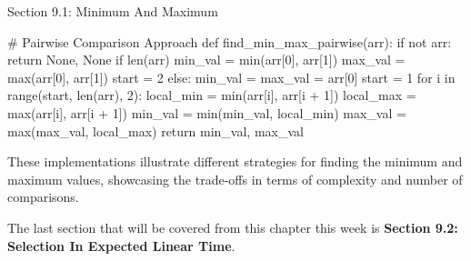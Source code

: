 \begin{notes}{Section 9.1: Minimum And Maximum}
\begin{highlight}
\begin{code}[Python]
    # Pairwise Comparison Approach
    def find_min_max_pairwise(arr):
        if not arr:
            return None, None
        if len(arr) %
            min_val = min(arr[0], arr[1])
            max_val = max(arr[0], arr[1])
            start = 2
        else:
            min_val = max_val = arr[0]
            start = 1
        for i in range(start, len(arr), 2):
            local_min = min(arr[i], arr[i + 1])
            local_max = max(arr[i], arr[i + 1])
            min_val = min(min_val, local_min)
            max_val = max(max_val, local_max)
        return min_val, max_val
    \end{code}
        These implementations illustrate different strategies for finding the minimum and maximum values, showcasing the trade-offs in terms of complexity and number of comparisons.
    \end{highlight}    
\end{notes}

The last section that will be covered from this chapter this week is \textbf{Section 9.2: Selection In Expected Linear Time}.

